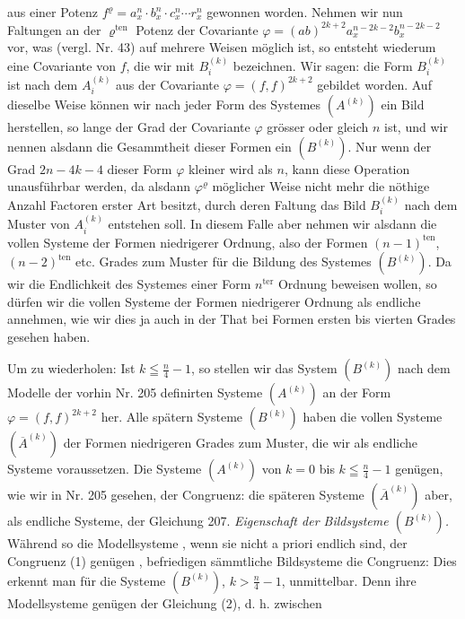 aus einer Potenz $f^\varrho = a_x^n \cdot b_x^n \cdot c_x^n \cdots r_x^n$ gewonnen worden. Nehmen
wir nun  Faltungen an der $\varrho^{\mathrm{ten}}$ Potenz der Covariante
$\varphi = (ab)^{2k+2} a_x^{n-2k-2} b_x^{n-2k-2}$ vor, was (vergl. Nr. 43) auf mehrere
Weisen möglich ist, so entsteht wiederum eine Covariante von $f$, die
wir mit $B_i^{(k)}$ bezeichnen. Wir sagen: die Form $B_i^{(k)}$ ist nach dem
 $A_i^{(k)}$ aus der Covariante $\varphi = (f,f)^{2k+2}$ gebildet worden. Auf
dieselbe Weise können wir nach jeder Form des Systemes $(A^{(k)})$ ein
Bild herstellen, so lange der Grad der Covariante $\varphi$ grösser oder
gleich $n$ ist, und wir nennen alsdann die Gesammtheit dieser Formen
ein  $(B^{(k)})$. Nur wenn der Grad $2n - 4k - 4$ dieser Form
$\varphi$ kleiner wird als $n$, kann diese Operation unausführbar werden, da
alsdann $\varphi^\varrho$ möglicher Weise nicht mehr die nöthige Anzahl Factoren
erster Art besitzt, durch deren Faltung das Bild $B_i^{(k)}$ nach dem Muster
von $A_i^{(k)}$ entstehen soll. In diesem Falle aber nehmen wir alsdann
die vollen Systeme der Formen niedrigerer Ordnung, also der Formen
$(n-1)^{\mathrm{ten}}$, $(n-2)^{\mathrm{ten}}$ etc. Grades zum Muster für die Bildung des
Systemes $(B^{(k)})$. Da wir die Endlichkeit des Systemes einer Form
$n^{\mathrm{ter}}$ Ordnung beweisen wollen, so dürfen wir die vollen Systeme der
Formen niedrigerer Ordnung als endliche annehmen, wie wir dies ja
auch in der That bei Formen ersten bis vierten Grades gesehen haben.

Um zu wiederholen: Ist $k \leqq \frac{n}{4} - 1$, so stellen wir das System
$(B^{(k)})$ nach dem Modelle der vorhin Nr. 205 definirten Systeme $(A^{(k)})$
an der Form $\varphi = (f,f)^{2k+2}$ her. Alle spätern Systeme $(B^{(k)})$ haben
die vollen Systeme $(\overline{A}^{(k)})$ der Formen niedrigeren Grades zum Muster,
die wir als endliche Systeme voraussetzen. Die Systeme $(A^{(k)})$ von
$k = 0$ bis $k \leqq \frac{n}{4} - 1$ genügen, wie wir in Nr. 205 gesehen, der
Congruenz:
die späteren Systeme $(\overline{A}^{(k)})$ aber, als endliche Systeme, der Gleichung
207. \textit{Eigenschaft der Bildsysteme $(B^{(k)})$.} Während so die Modellsysteme
, wenn sie nicht a priori endlich sind, der Congruenz (1) genügen
, befriedigen sämmtliche Bildsysteme die Congruenz:
Dies erkennt man für die Systeme $(B^{(k)})$, $k > \frac{n}{4} - 1$, unmittelbar.
Denn ihre Modellsysteme genügen der Gleichung (2), d. h. zwischen


